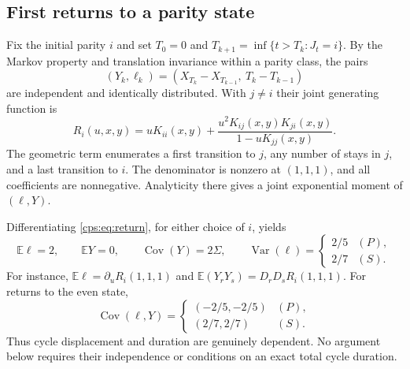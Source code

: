 \documentclass[11pt,letterpaper]{article}
\numberwithin{equation}{section}
\theoremstyle{remark}\newtheorem{remark}[theorem]{Remark}
\newcommand{\EE}{\mathbb E}
\newcommand{\Cov}{\operatorname{Cov}}
\newcommand{\Var}{\operatorname{Var}}
\begin{document}
\subsection{First returns to a parity state}
Fix the initial parity $i$ and set $T_0=0$ and $T_{k+1}=\inf\{t>T_k:J_t=i\}$. By the Markov property and translation invariance within a parity class, the pairs
\begin{equation}
 (Y_k,\ell_k)=(X_{T_k}-X_{T_{k-1}},\ T_k-T_{k-1})
\end{equation}
are independent and identically distributed. With $j\ne i$ their joint generating function is
\begin{equation}\label{cps:eq:return}
 R_i(u,x,y)=uK_{ii}(x,y)+\frac{u^2K_{ij}(x,y)K_{ji}(x,y)}{1-uK_{jj}(x,y)}.
\end{equation}
The geometric term enumerates a first transition to $j$, any number of stays in $j$, and a last transition to $i$. The denominator is nonzero at $(1,1,1)$, and all coefficients are nonnegative. Analyticity there gives a joint exponential moment of $(\ell,Y)$.

Differentiating \eqref{cps:eq:return}, for either choice of $i$, yields
\begin{equation}\label{cps:eq:cyclemoments}
 \EE\ell=2,\qquad \EE Y=0,\qquad \Cov(Y)=2\Sigma,
 \qquad
 \Var(\ell)=\begin{cases}2/5&(P),\\2/7&(S).
 \end{cases}
\end{equation}
For instance, $\EE\ell=\partial_u R_i(1,1,1)$ and
$\EE(Y_rY_s)=D_rD_sR_i(1,1,1)$. For returns to the even state,
\begin{equation}
 \Cov(\ell,Y)=\begin{cases}(-2/5,-2/5)&(P),\\(2/7,2/7)&(S).
 \end{cases}
\end{equation}
Thus cycle displacement and duration are genuinely dependent. No argument below requires their independence or conditions on an exact total cycle duration.
\end{document}
